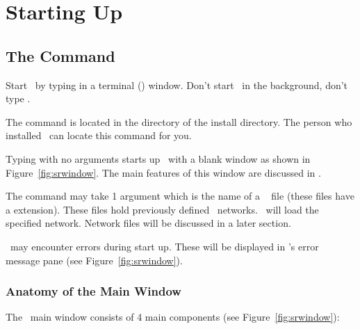 %

  \newcommand{\srwindow}%
  {\centerline{\epsfig{file=figures/srwindow.eps,width=\columnwidth}}}
\begin{htmlonly}
  \newcommand{\srwindow}{%
  \htmladdimg[align=top,width=6,alt="SCIRun Window"]
  {../figures/srwindow.gif}}
\end{htmlonly}


\section{Starting Up}
\label{sec:startingup}

\subsection{The  Command}
\label{sec:sciruncmd}

Start \sr\ by typing  in a terminal (\eg {})
window.  Don't start \sr\ in the background, \ie don't type
.

The  command is located in the  directory of
the \directory{\sr} install directory.  The person who installed \sr\ can
locate this command for you.

Typing  with no arguments starts up \sr\ with a blank \sr
window as shown in Figure~\ref{fig:srwindow}.  The main features of this
window are discussed in .

The  command may take 1 argument which is the name of a
\sr\   file (these files have a 
extension).  These files hold previously defined \sr\ networks.  \sr\ will
load the specified network.  Network files will be discussed in a later
section.

\sr\ may encounter errors during start up.  These will be displayed in \sr{}'s
error message pane (see Figure~\ref{fig:srwindow}).  

\subsubsection{Anatomy of the Main Window}
\label{sec:windowanatomy}

The \sr\ main window consists of 4 main components (see Figure~\ref{fig:srwindow}):

